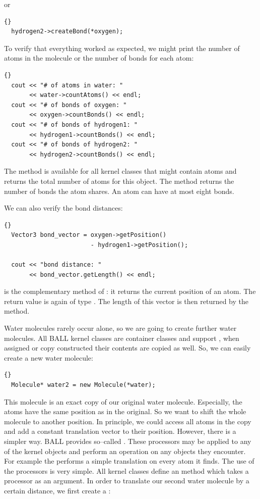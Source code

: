 or

\begin{lstlisting}{}
  hydrogen2->createBond(*oxygen);
\end{lstlisting}

\noindent
To verify that everything worked as expected, we might print the number of
atoms in the molecule or the number of bonds for each atom:
	
\begin{lstlisting}{}
  cout << "# of atoms in water: " 
       << water->countAtoms() << endl;
  cout << "# of bonds of oxygen: " 
       << oxygen->countBonds() << endl;
  cout << "# of bonds of hydrogen1: " 
       << hydrogen1->countBonds() << endl;
  cout << "# of bonds of hydrogen2: " 
       << hydrogen2->countBonds() << endl;
\end{lstlisting}

\noindent
The method  is available for all kernel classes that might
contain atoms and returns the total number of atoms for this object. The
method  returns the number of bonds the atom shares. An
atom can have at most eight bonds.

We can also verify the bond distances:
\begin{lstlisting}{}
  Vector3 bond_vector = oxygen->getPosition() 
                        - hydrogen1->getPosition();

  cout << "bond distance: " 
       << bond_vector.getLength() << endl;
\end{lstlisting}
	
\noindent
{} is the complementary method of : it
returns the current position of an atom. The return value is again of type
. The length of this vector is then returned by the
 method. 

Water molecules rarely occur alone, so we are going to create further water molecules.
All BALL kernel classes are container classes and support , \ie when assigned or copy constructed their contents are copied as
well. So, we can easily create a new water molecule:

\begin{lstlisting}{}
  Molecule* water2 = new Molecule(*water);
\end{lstlisting}
	
\noindent
This molecule is an exact copy of our original water molecule. Especially, the
atoms have the same position as in the original. So we want to shift the whole
molecule to another position.  In principle, we could access all atoms in the
copy and add a constant translation vector to their position. However, there
is a simpler way. BALL provides so--called . These
processors may be applied to any of the kernel objects and perform an
operation on any objects they encounter. For example the
 performs a simple translation on every atom it
finds. The use of the processors is very simple.  All kernel classes define an
 method which takes a processor as an argument. In order to
translate our second water molecule by a certain distance, we first create a
:

